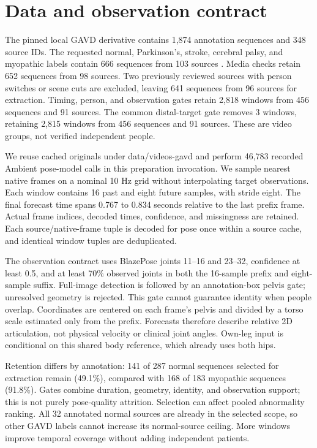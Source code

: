 \documentclass[letterpaper]{article}
\begin{document}
\section{Data and observation contract}

The pinned local GAVD derivative contains 1,874 annotation sequences and 348 source IDs. The requested normal, Parkinson's, stroke, cerebral palsy, and myopathic labels contain 666 sequences from 103 sources \citep{ranjan2025}. Media checks retain 652 sequences from 98 sources. Two previously reviewed sources with person switches or scene cuts are excluded, leaving 641 sequences from 96 sources for extraction. Timing, person, and observation gates retain 2,818 windows from 456 sequences and 91 sources. The common distal-target gate removes 3 windows, retaining 2,815 windows from 456 sequences and 91 sources. These are video groups, not verified independent people.

We reuse cached originals under data/videos-gavd and perform 46,783 recorded Ambient pose-model calls in this preparation invocation. We sample nearest native frames on a nominal 10 Hz grid without interpolating target observations. Each window contains 16 past and eight future samples, with stride eight. The final forecast time spans 0.767 to 0.834 seconds relative to the last prefix frame. Actual frame indices, decoded times, confidence, and missingness are retained. Each source/native-frame tuple is decoded for pose once within a source cache, and identical window tuples are deduplicated.

The observation contract uses BlazePose joints 11--16 and 23--32, confidence at least 0.5, and at least 70\% observed joints in both the 16-sample prefix and eight-sample suffix. Full-image detection is followed by an annotation-box pelvis gate; unresolved geometry is rejected. This gate cannot guarantee identity when people overlap. Coordinates are centered on each frame's pelvis and divided by a torso scale estimated only from the prefix. Forecasts therefore describe relative 2D articulation, not physical velocity or clinical joint angles. Own-leg input is conditional on this shared body reference, which already uses both hips.

Retention differs by annotation: 141 of 287 normal sequences selected for extraction remain (49.1\%), compared with 168 of 183 myopathic sequences (91.8\%). Gates combine duration, geometry, identity, and observation support; this is not purely pose-quality attrition. Selection can affect pooled abnormality ranking. All 32 annotated normal sources are already in the selected scope, so other GAVD labels cannot increase its normal-source ceiling. More windows improve temporal coverage without adding independent patients.
\end{document}
